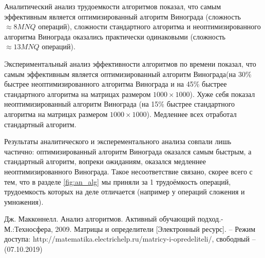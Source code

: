 \documentclass[a4paper,12pt]{article}
\begin{document}
	Аналитический анализ трудоемкости алгоритмов показал, что самым эффективным является оптимизированный алгоритм Винограда (сложность $\approx8MNQ$ операций), сложности стандартного  алгоритма и неоптимизированного алгоритма Винограда оказались практически одинаковыми (сложность $\approx13MNQ$ операций).
	
	Экспериментальный анализ эффективности алгоритмов по времени показал, что самым эффективным является оптимизированный алгоритм Винограда(на 30\% быстрее неоптимизированного алгоритма Винограда и на 45\% быстрее стандартного алгоритма на матрицах размером $1000 \times 1000$). Хуже себя показал неоптимизированный алгоритм Винограда (на 15\% быстрее стандартного алгоритма на матрицах размером $1000 \times 1000$). Медленнее всех отработал стандартный алгоритм. 
	
	Результаты аналитического и эксперементального анализа совпали лишь частично: оптимизированный алгоритм Винограда оказался самым быстрым, а стандартный алгоритм, вопреки ожиданиям, оказался медленнее неоптимизированного Винограда. Такое несоответствие связано, скорее всего с тем, что в разделе \ref{fig:an_alg} мы приняли за 1 трудоёмкость операций, трудоемкость которых на деле отличается (например у операций сложения и умножения).


\pagebreak
{}
\begin{thebibliography}{4}
Дж. Макконнелл. Анализ алгоритмов. Активный обучающий подход.-
М.:Техносфера, 2009.
Матрицы и определители [Электронный ресурс]. – Режим доступа: http://matematika.electrichelp.ru/matricy-i-opredeliteli/, свободный – (07.10.2019)

\end{thebibliography}
\end{document}
